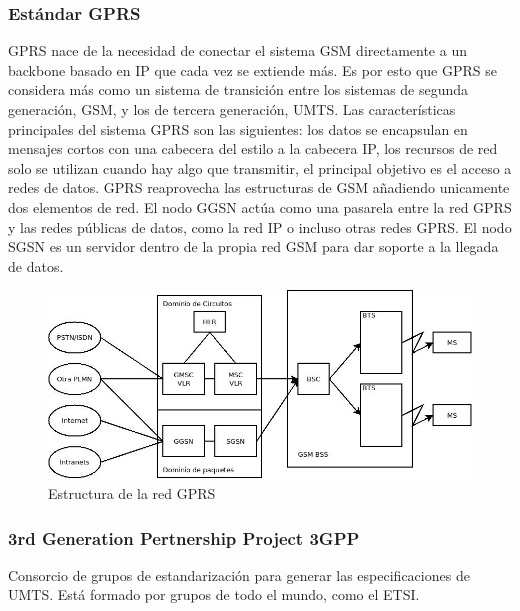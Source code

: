 \subsubsection{Estándar \acrshort{GPRS}}
\label{ssub:GPRS}
	\acrshort{GPRS} nace de la necesidad de conectar el sistema \acrshort{GSM} directamente a un backbone basado en IP que cada vez se extiende más. Es por esto que \acrshort{GPRS} se considera más como un sistema de transición entre los sistemas de segunda generación, \acrshort{GSM}, y los de tercera generación, \acrshort{UMTS}. Las características principales del sistema \acrshort{GPRS} son las siguientes: los datos se encapsulan en mensajes cortos con una cabecera del estilo a la cabecera IP, los recursos de red solo se utilizan cuando hay algo que transmitir, el principal objetivo es el acceso a redes de datos. \acrshort{GPRS} reaprovecha las estructuras de \acrshort{GSM} añadiendo unicamente dos elementos de red. El nodo GGSN actúa como una pasarela entre la red \acrshort{GPRS} y las redes públicas de datos, como la red IP o incluso otras redes \acrshort{GPRS}. El nodo SGSN es un servidor dentro de la propia red \acrshort{GSM} para dar soporte a la llegada de datos.
\begin{figure}[H]
\centering
\includegraphics[width=\textwidth]{Imagen/diaGPRS.jpg}
\caption{Estructura de la red \acrshort{GPRS}}
\label{img:estructuraGPRS}
\end{figure}
\subsubsection{3rd Generation Pertnership Project 3GPP}
\label{ssub:3GPP}
	Consorcio de grupos de estandarización para generar las especificaciones de \acrshort{UMTS}. Está formado por grupos de todo el mundo, como el \acrshort{ETSI}. 
